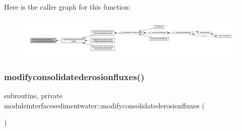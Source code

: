 Here is the caller graph for this function\+:\nopagebreak
\begin{figure}[H]
\begin{center}
\leavevmode
\includegraphics[width=350pt]{namespacemoduleinterfacesedimentwater_a299f7798fddc9b92224d7bf9ec6785c0_icgraph}
\end{center}
\end{figure}
\mbox{\label{namespacemoduleinterfacesedimentwater_a15dcf3dbb1639d562e8cfd2115b95c41}} 
\subsubsection{\texorpdfstring{modifyconsolidatederosionfluxes()}{modifyconsolidatederosionfluxes()}}
{\footnotesize\ttfamily subroutine, private moduleinterfacesedimentwater\+::modifyconsolidatederosionfluxes (\begin{DoxyParamCaption}{ }\end{DoxyParamCaption})\hspace{0.3cm}{\ttfamily [private]}}

